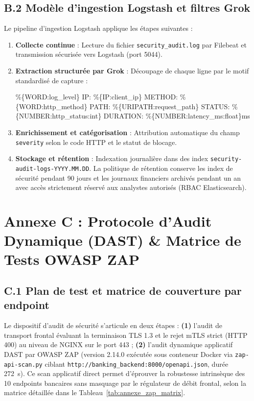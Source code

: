 \subsection*{B.2 Modèle d'ingestion Logstash et filtres Grok}
Le pipeline d'ingestion Logstash applique les étapes suivantes :
\begin{enumerate}[leftmargin=*]
    \item \textbf{Collecte continue} : Lecture du fichier \texttt{security\_audit.log} par Filebeat et transmission sécurisée vers Logstash (port 5044).
    \item \textbf{Extraction structurée par Grok} : Découpage de chaque ligne par le motif standardisé de capture :
    \begin{tcolorbox}[colback=gray!8,colframe=gray!40,arc=1mm,boxrule=0.5pt,left=2pt,right=2pt,top=2pt,bottom=2pt]
    \footnotesize{} \textbar{} \%\{WORD:log\_level\} \textbar{} IP: \%\{IP:client\_ip\} \textbar{} METHOD: \%\{WORD:http\_method\} \textbar{} PATH: \%\{URIPATH:request\_path\} \textbar{} STATUS: \%\{NUMBER:http\_status:int\} \textbar{} DURATION: \%\{NUMBER:latency\_ms:float\}ms
    \end{tcolorbox}
    \item \textbf{Enrichissement et catégorisation} : Attribution automatique du champ \texttt{severity} selon le code HTTP et le statut de blocage.
    \item \textbf{Stockage et rétention} : Indexation journalière dans des index \texttt{security-audit-logs-YYYY.MM.DD}. La politique de rétention conserve les index de sécurité pendant 90 jours et les journaux financiers archivés pendant un an avec accès strictement réservé aux analystes autorisés (RBAC Elasticsearch).
\end{enumerate}

\clearpage
\section*{Annexe C : Protocole d'Audit Dynamique (DAST) \& Matrice de Tests OWASP ZAP}

\subsection*{C.1 Plan de test et matrice de couverture par endpoint}
Le dispositif d'audit de sécurité s'articule en deux étapes : \textbf{(1)} l'audit de transport frontal évaluant la terminaison TLS 1.3 et le rejet mTLS strict (HTTP 400) au niveau de NGINX sur le port 443 ; \textbf{(2)} l'audit dynamique applicatif DAST par OWASP ZAP (version 2.14.0 exécutée sous conteneur Docker via \texttt{zap-api-scan.py} ciblant \texttt{http://banking\_backend:8000/openapi.json}, durée 272~s). Ce scan applicatif direct permet d'éprouver la robustesse intrinsèque des 10 endpoints bancaires sans masquage par le régulateur de débit frontal, selon la matrice détaillée dans le Tableau~\ref{tab:annexe_zap_matrix}.

